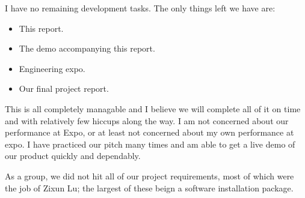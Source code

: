 I have no remaining development tasks.
The only things left we have are:

\begin{itemize}
  \item This report.
  \item The demo accompanying this report.
  \item Engineering expo.
  \item Our final project report.
\end{itemize}

This is all completely managable and I believe we will complete all of it on time and with relatively few hiccups along the way.
I am not concerned about our performance at Expo, or at least not concerned about my own performance at expo.
I have practiced our pitch many times and am able to get a live demo of our product quickly and dependably.

As a group, we did not hit all of our project requirements, most of which were the job of Zixun Lu; the largest of these beign a software installation package.
